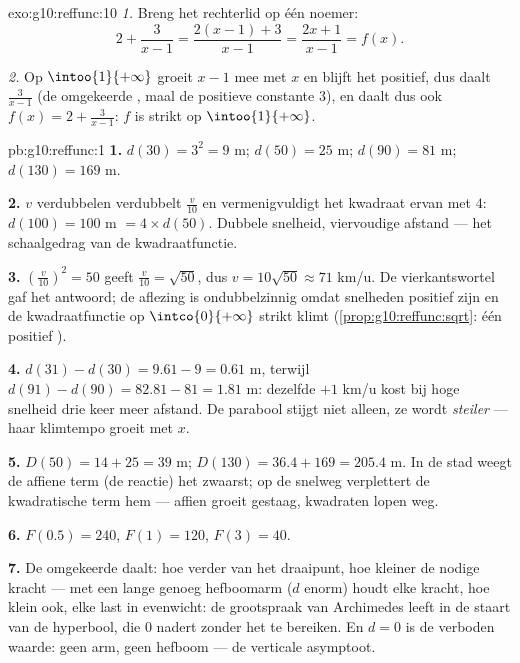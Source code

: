 \begin{solution}{exo:g10:reffunc:10}
\emph{1.} Breng het rechterlid op één noemer:
\[
2 + \frac{3}{x-1} = \frac{2(x-1) + 3}{x - 1} = \frac{2x + 1}{x - 1}
= f(x).
\]

\emph{2.} Op $\intoo{1}{+\infty}$ groeit $x - 1$ mee met $x$ en blijft het
positief, dus daalt $\frac{3}{x-1}$ (de omgekeerde , maal de
positieve constante $3$), en daalt dus ook $f(x) = 2 + \frac{3}{x-1}$: $f$
is strikt  op $\intoo{1}{+\infty}$.
\end{solution}

\begin{solution}{pb:g10:reffunc:1}
\textbf{1.} $d(30) = 3^2 = 9$ m; $d(50) = 25$ m; $d(90) = 81$ m;
$d(130) = 169$ m.

\textbf{2.} $v$ verdubbelen verdubbelt $\frac v{10}$ en vermenigvuldigt het
kwadraat ervan met $4$: $d(100) = 100$ m $= 4 \times d(50)$. Dubbele
snelheid, viervoudige afstand --- het schaalgedrag van de kwadraatfunctie.

\textbf{3.} $\left(\frac{v}{10}\right)^2 = 50$ geeft
$\frac{v}{10} = \sqrt{50}$, dus $v = 10\sqrt{50} \approx 71$ km/u. De
vierkantswortel gaf het antwoord; de aflezing is ondubbelzinnig omdat
snelheden positief zijn en de kwadraatfunctie op $\intco{0}{+\infty}$ strikt
klimt (\cref{prop:g10:reffunc:sqrt}: één positief ).

\textbf{4.} $d(31) - d(30) = 9.61 - 9 = 0.61$ m, terwijl
$d(91) - d(90) = 82.81 - 81 = 1.81$ m: dezelfde $+1$ km/u kost bij hoge
snelheid drie keer meer afstand. De parabool stijgt niet alleen, ze wordt
\emph{steiler} --- haar klimtempo groeit met $x$.

\textbf{5.} $D(50) = 14 + 25 = 39$ m; $D(130) = 36.4 + 169 = 205.4$ m. In de
stad weegt de affiene term (de reactie) het zwaarst; op de snelweg
verplettert de kwadratische term hem --- affien groeit gestaag, kwadraten
lopen weg.

\textbf{6.} $F(0.5) = 240$, $F(1) = 120$, $F(3) = 40$.

\textbf{7.} De omgekeerde  daalt: hoe verder van het draaipunt, hoe
kleiner de nodige kracht --- met een lange genoeg hefboomarm ($d$ enorm)
houdt elke kracht, hoe klein ook, elke last in evenwicht: de grootspraak van
Archimedes leeft in de staart van de hyperbool, die $0$ nadert zonder het te
bereiken. En $d = 0$ is de verboden waarde: geen arm, geen hefboom --- de
verticale asymptoot.


\end{solution}
